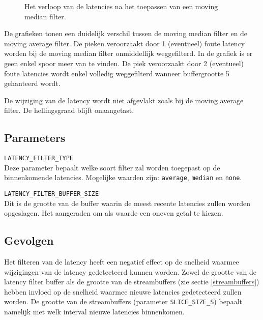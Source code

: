 \begin{figure}[!tbph]
	\centering
	\hfill
	\captionsetup{width=0.7\textwidth}
	\caption{Het verloop van de latencies na het toepassen van een moving median filter.}
\end{figure}

De grafieken tonen een duidelijk verschil tussen de moving median filter en de moving average filter. De pieken veroorzaakt door 1 (eventueel) foute latency worden bij de moving median filter onmiddellijk weggefilterd. In de grafiek is er geen enkel spoor meer van te vinden. De piek veroorzaakt door 2 (eventueel) foute latencies wordt enkel volledig weggefilterd wanneer buffergrootte 5 gehanteerd wordt.

De wijziging van de latency wordt niet afgevlakt zoals bij de moving average filter. De hellingsgraad blijft onaangetast.

\subsection{Parameters}

\begin{description}
	\item\texttt{LATENCY\_FILTER\_TYPE} \hfill \\
	Deze parameter bepaalt welke soort filter zal worden toegepast op de binnenkomende latencies. Mogelijke waarden zijn: \texttt{average}, \texttt{median} en \texttt{none}.
	
	\item\texttt{LATENCY\_FILTER\_BUFFER\_SIZE} \hfill \\
	Dit is de grootte van de buffer waarin de meest recente latencies zullen worden opgeslagen. Het aangeraden om als waarde een oneven getal te kiezen.

\end{description}

\subsection{Gevolgen}
\label{filter-gevolgen}

Het filteren van de latency heeft een negatief effect op de snelheid waarmee wijzigingen van de latency gedetecteerd kunnen worden. Zowel de grootte van de latency filter buffer als de grootte van de streambuffers (zie sectie \ref{streambuffers}) hebben invloed op de snelheid waarmee nieuwe latencies gedetecteerd zullen worden. De grootte van de streambuffers (parameter \texttt{SLICE\_SIZE\_S}) bepaalt namelijk met welk interval nieuwe latencies binnenkomen. 


